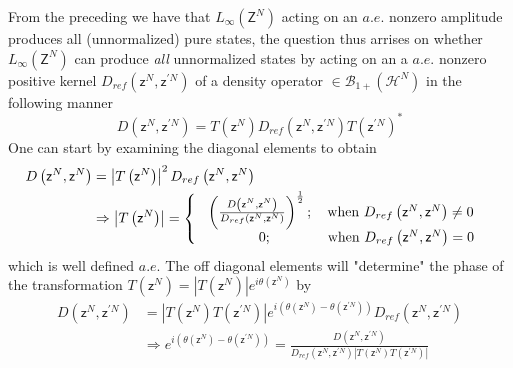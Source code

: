 \documentclass[aps,preprint]{revtex4}%
\begin{document}
From the preceding we have that $L_{\infty}\left(  \mathsf{Z}^{N}\right)  $
acting on an $a.e.$ nonzero amplitude produces all (unnormalized) pure states,
the question thus arrises on whether $L_{\infty}\left(  \mathsf{Z}^{N}\right)
$ can produce \emph{all} unnormalized states by acting on an a $a.e.$ nonzero
positive kernel $D_{ref}\left(  \mathsf{z}^{N},\mathsf{z}^{\prime N}\right)  $
of a density operator $\in\mathcal{B}_{1+}\left(  \mathcal{H}^{N}\right)  $ in
the following manner%
\begin{equation}
D\left(  \mathsf{z}^{N},\mathsf{z}^{\prime N}\right)  =T\left(  \mathsf{z}%
^{N}\right)  D_{ref}\left(  \mathsf{z}^{N},\mathsf{z}^{\prime N}\right)
T\left(  \mathsf{z}^{\prime N}\right)  ^{\ast}%
\end{equation}
One can start by examining the diagonal elements to obtain
\begin{align}
D\left(  \mathsf{z}^{N},\mathsf{z}^{N}\right)   &  =\left\vert T\left(
\mathsf{z}^{N}\right)  \right\vert ^{2}D_{ref}\left(  \mathsf{z}%
^{N},\mathsf{z}^{N}\right) \nonumber\\
&  \Rightarrow\left\vert T\left(  \mathsf{z}^{N}\right)  \right\vert =\left\{
%
\begin{array}
[c]{c}%
\left(  \frac{D\left(  \mathsf{z}^{N},\mathsf{z}^{N}\right)  }{D_{ref}\left(
\mathsf{z}^{N},\mathsf{z}^{N}\right)  }\right)  ^{\frac{1}{2}};\quad\text{when
}D_{ref}\left(  \mathsf{z}^{N},\mathsf{z}^{N}\right)  \neq0\\
\qquad\qquad0;\qquad\qquad\text{when }D_{ref}\left(  \mathsf{z}^{N}%
,\mathsf{z}^{N}\right)  =0\text{ }%
\end{array}
\right.  \text{ }%
\end{align}
which is well defined $a.e.$ The off diagonal elements will "determine" the
phase of the transformation $T\left(  \mathsf{z}^{N}\right)  =\left\vert
T\left(  \mathsf{z}^{N}\right)  \right\vert e^{i\theta\left(  \mathsf{z}%
^{N}\right)  }$ by
\begin{align}
D\left(  \mathsf{z}^{N},\mathsf{z}^{\prime N}\right)   &  =\left\vert T\left(
\mathsf{z}^{N}\right)  T\left(  \mathsf{z}^{\prime N}\right)  \right\vert
e^{i\left(  \theta\left(  \mathsf{z}^{N}\right)  -\theta\left(  \mathsf{z}%
^{\prime N}\right)  \right)  }D_{ref}\left(  \mathsf{z}^{N},\mathsf{z}^{\prime
N}\right) \nonumber\\
&  \Rightarrow e^{i\left(  \theta\left(  \mathsf{z}^{N}\right)  -\theta\left(
\mathsf{z}^{\prime N}\right)  \right)  }=\frac{D\left(  \mathsf{z}%
^{N},\mathsf{z}^{\prime N}\right)  }{D_{ref}\left(  \mathsf{z}^{N}%
,\mathsf{z}^{\prime N}\right)  \left\vert T\left(  \mathsf{z}^{N}\right)
T\left(  \mathsf{z}^{\prime N}\right)  \right\vert }%
\end{align}
\end{document}
